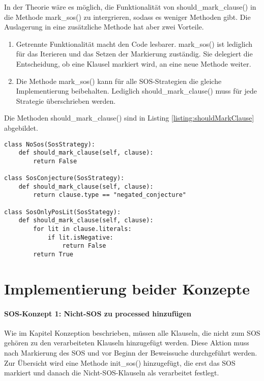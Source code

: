In der Theorie wäre es möglich, die Funktionalität von should\_mark\_clause() in die Methode mark\_sos() zu intergrieren, sodass es weniger Methoden gibt. Die Auslagerung in eine zusätzliche Methode hat aber zwei Vorteile.
\begin{enumerate}
	\item Getrennte Funktionalität macht den Code lesbarer. mark\_sos() ist lediglich für das Iterieren und das Setzen der Markierung zuständig. Sie delegiert die Entscheidung, ob eine Klausel markiert wird, an eine neue Methode weiter.
	\item Die Methode mark\_sos() kann für alle SOS-Strategien die gleiche Implementierung beibehalten. Lediglich should\_mark\_clause() muss für jede Strategie überschrieben werden.
\end{enumerate}

Die Methoden should\_mark\_clause() sind in Listing \ref{listing:shouldMarkClause} abgebildet.
\begin{lstlisting}[caption={Markierungsmethoden für drei der vier SOS-Strategien. Die Klasse SosOnlyNegLit wurde weggelassen, da sie die gleiche Codestuktur wie SosOnlyPosLit besitzt.}, label={listing:shouldMarkClause}]
class NoSos(SosStrategy):
	def should_mark_clause(self, clause):
		return False

class SosConjecture(SosStrategy):
	def should_mark_clause(self, clause):
		return clause.type == "negated_conjecture"
		
class SosOnlyPosLit(SosStategy):
    def should_mark_clause(self, clause):
		for lit in clause.literals:
			if lit.isNegative:
				return False
		return True
\end{lstlisting}


\section{Implementierung beider Konzepte}

\paragraph{SOS-Konzept 1: Nicht-SOS zu processed hinzufügen}

Wie im Kapitel Konzeption beschrieben, müssen alle Klauseln, die nicht zum SOS gehören zu den verarbeiteten Klauseln hinzugefügt werden. Diese Aktion muss nach Markierung des SOS und vor Beginn der Beweissuche durchgeführt werden. Zur Übersicht wird eine Methode init\_sos() hinzugefügt, die erst das SOS markiert und danach die Nicht-SOS-Klauseln als verarbeitet festlegt.

